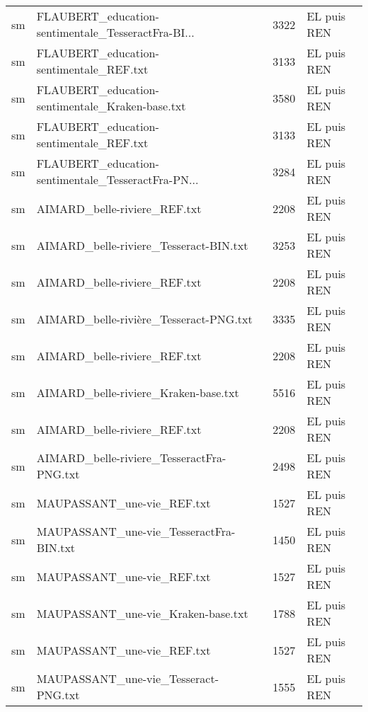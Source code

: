 \begin{tabular}{llrl}
    sm & FLAUBERT\_education-sentimentale\_TesseractFra-BI... &                  3322 & EL puis REN \\
    sm &            FLAUBERT\_education-sentimentale\_REF.txt &                  3133 & EL puis REN \\
    sm &    FLAUBERT\_education-sentimentale\_Kraken-base.txt &                  3580 & EL puis REN \\
    sm &            FLAUBERT\_education-sentimentale\_REF.txt &                  3133 & EL puis REN \\
    sm & FLAUBERT\_education-sentimentale\_TesseractFra-PN... &                  3284 & EL puis REN \\
    sm &                       AIMARD\_belle-riviere\_REF.txt &                  2208 & EL puis REN \\
    sm &             AIMARD\_belle-riviere\_Tesseract-BIN.txt &                  3253 & EL puis REN \\
    sm &                       AIMARD\_belle-riviere\_REF.txt &                  2208 & EL puis REN \\
    sm &             AIMARD\_belle-rivière\_Tesseract-PNG.txt &                  3335 & EL puis REN \\
    sm &                       AIMARD\_belle-riviere\_REF.txt &                  2208 & EL puis REN \\
    sm &               AIMARD\_belle-riviere\_Kraken-base.txt &                  5516 & EL puis REN \\
    sm &                       AIMARD\_belle-riviere\_REF.txt &                  2208 & EL puis REN \\
    sm &          AIMARD\_belle-riviere\_TesseractFra-PNG.txt &                  2498 & EL puis REN \\
    sm &                         MAUPASSANT\_une-vie\_REF.txt &                  1527 & EL puis REN \\
    sm &            MAUPASSANT\_une-vie\_TesseractFra-BIN.txt &                  1450 & EL puis REN \\
    sm &                         MAUPASSANT\_une-vie\_REF.txt &                  1527 & EL puis REN \\
    sm &                 MAUPASSANT\_une-vie\_Kraken-base.txt &                  1788 & EL puis REN \\
    sm &                         MAUPASSANT\_une-vie\_REF.txt &                  1527 & EL puis REN \\
    sm &               MAUPASSANT\_une-vie\_Tesseract-PNG.txt &                  1555 & EL puis REN \\

\end{tabular}
